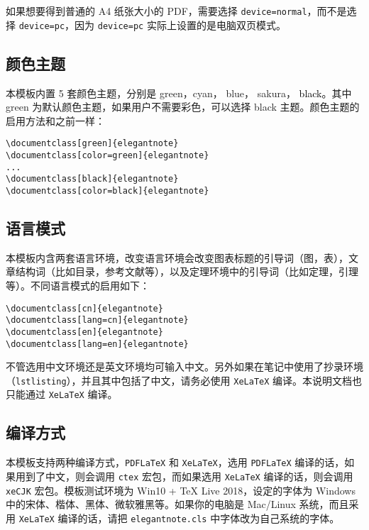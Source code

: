 \documentclass[cn,pad,11pt,green,geye]{../elegantnote}
\begin{document}
\begin{note}
如果想要得到普通的 A4 纸张大小的 PDF，需要选择 \lstinline{device=normal}，而不是选择 \lstinline{device=pc}，因为  \lstinline{device=pc} 实际上设置的是电脑双页模式。
\end{note}

\subsection{颜色主题}
本模板内置 5 套颜色主题，分别是 \textcolor{egreen}{green}，\textcolor{ecyan}{cyan}， \textcolor{eblue}{blue}， \textcolor{sakura}{sakura}， \textcolor{black}{black}。其中 green 为默认颜色主题，如果用户不需要彩色，可以选择 black 主题。颜色主题的启用方法和之前一样：
\begin{lstlisting}[frame=none]  
\documentclass[green]{elegantnote}
\documentclass[color=green]{elegantnote}
...
\documentclass[black]{elegantnote}
\documentclass[color=black]{elegantnote}
\end{lstlisting}

\subsection{语言模式}
本模板内含两套语言环境，改变语言环境会改变图表标题的引导词（图，表），文章结构词（比如目录，参考文献等），以及定理环境中的引导词（比如定理，引理等）。不同语言模式的启用如下：
\begin{lstlisting}[frame=none]  
\documentclass[cn]{elegantnote} 
\documentclass[lang=cn]{elegantnote}
\documentclass[en]{elegantnote} 
\documentclass[lang=en]{elegantnote}
\end{lstlisting}
\begin{note}
不管选用中文环境还是英文环境均可输入中文。另外如果在笔记中使用了抄录环境（\lstinline{lstlisting}），并且其中包括了中文，请务必使用 \lstinline{XeLaTeX} 编译。本说明文档也只能通过 \lstinline{XeLaTeX} 编译。
\end{note}

\subsection{编译方式}

本模板支持两种编译方式，\lstinline{PDFLaTeX} 和 \lstinline{XeLaTeX}，选用 \lstinline{PDFLaTeX} 编译的话，如果用到了中文，则会调用 \lstinline{ctex} 宏包，而如果选用 \lstinline{XeLaTeX} 编译的话，则会调用 \lstinline{xeCJK} 宏包。模板测试环境为 Win10 + \TeX{} Live 2018，设定的字体为 Windows 中的宋体、楷体、黑体、微软雅黑等。如果你的电脑是 Mac/Linux 系统，而且采用 \lstinline{XeLaTeX} 编译的话，请把 \lstinline{elegantnote.cls} 中字体改为自己系统的字体。
\end{document}
